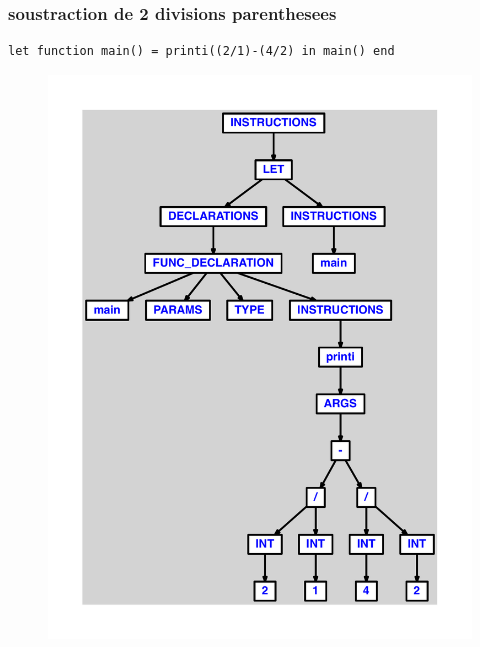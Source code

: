 \documentclass{article}
\begin{document}
\subsubsection{soustraction de 2 divisions parenthesees}
\begin{lstlisting}
let function main() = printi((2/1)-(4/2) in main() end
\end{lstlisting}
\newpage
\begin{figure}[H]
\centering
\includegraphics[max width=\textwidth]{ast/ast_109.pdf}
\end{figure}
\newpage
\end{document}
